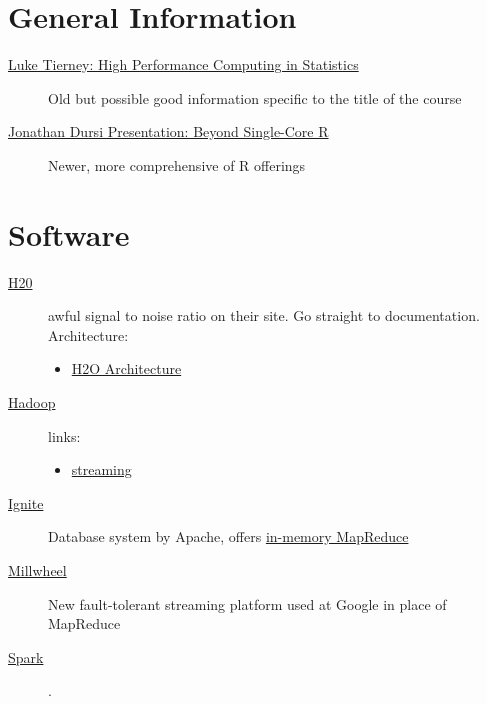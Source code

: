 \documentclass[a4paper, 11pt]{article}
\author{Jason Cairns}
\date{\today}
\title{}
\begin{document}
\section{General Information}
\label{sec:orgc4728f7}
\begin{description}
\item[{\href{http://homepage.divms.uiowa.edu/\~luke/classes/295-hpc/}{Luke Tierney: High Performance Computing in Statistics}}] Old but
possible good information specific to the title of the course
\item[{\href{https://ljdursi.github.io/beyond-single-core-R/\#/}{Jonathan Dursi Presentation: Beyond Single-Core R}}] Newer, more
comprehensive of R offerings
\end{description}

\section{Software}
\label{sec:orgcb07fda}
\begin{description}
\item[{\href{https://www.h2o.ai/}{H20}}] awful signal to noise ratio on their site. Go straight to
documentation. Architecture:
\begin{itemize}
\item \href{http://docs.h2o.ai/h2o/latest-stable/h2o-docs/architecture.html}{H2O Architecture}
\end{itemize}
\item[{\href{https://hadoop.apache.org/}{Hadoop}}] links:
\begin{itemize}
\item \href{https://hadoop.apache.org/docs/r1.2.1/streaming.html}{streaming}
\end{itemize}
\item[{\href{https://ignite.apache.org/index.html}{Ignite}}] Database system by Apache, offers \href{https://ignite.apache.org/features/mapreduce.html}{in-memory MapReduce}
\item[{\href{https://research.google/pubs/pub41378/}{Millwheel}}] New fault-tolerant streaming platform used at Google in
place of MapReduce
\item[{\href{https://spark.apache.org/}{Spark}}] .
\end{description}
\end{document}
